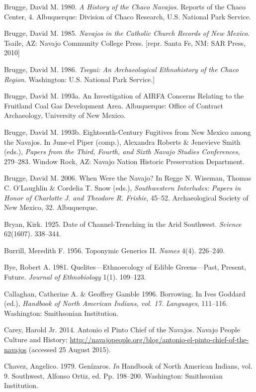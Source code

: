 Brugge, David M. 1980.  \textit{A History of the Chaco Navajos}.  Reports of the Chaco Center, 4.  Albuquerque:  Division of Chaco Research, U.S. National Park Service.

Brugge, David M. 1985. \textit{Navajos in the Catholic Church Records of New Mexico}.  Tsaile, AZ:  Navajo Community College Press.  [repr. Santa Fe, NM:  SAR Press, 2010]

Brugge, David M. 1986. \textit{Tsegai: An Archaeological Ethnohistory of the Chaco Region}.  Washington:  U.S. National Park Service.]

Brugge, David M. 1993a. An Investigation of AIRFA Concerns Relating to the Fruitland Coal Gas Development Area.  Albuquerque:  Office of Contract Archaeology, University of New Mexico.

Brugge, David M. 1993b.  Eighteenth-Century Fugitives from New Mexico among the Navajos.  In June-el Piper (comp.), Alexandra Roberts \& Jenevieve Smith (eds.), \textit{Papers from the Third, Fourth, and Sixth Navajo Studies Conferences}, 279--283.  Window Rock, AZ:  Navajo Nation Historic Preservation Department.

Brugge, David M. 2006.  When Were the Navajo? In Regge N. Wiseman, Thomas C. O’Laughlin \& Cordelia T. Snow (eds.), \textit{Southwestern Interludes: Papers in Honor of Charlotte J. and Theodore R. Frisbie}, 45--52.  Archaeological Society of New Mexico, 32.  Albuquerque.

Bryan, Kirk.  1925.  Date of Channel-Trenching in the Arid Southwest.  \textit{Science} 62(1607). 338--344.

Burrill, Meredith F.  1956.  Toponymic Generics II.  \textit{Names} 4(4). 226--240.

Bye, Robert A. 1981.  Quelites—Ethnoecology of Edible Greens—Past, Present, Future.  \textit{Journal of Ethnobiology} 1(1). 109--123.

Callaghan, Catherine A. \& Geoffrey Gamble  1996.  Borrowing. In Ives Goddard (ed.), \textit{Handbook of North American Indians, vol. 17.  Languages}, 111--116.  Washington:  Smithsonian Institution.

Carey, Harold Jr.  2014.  Antonio el Pinto Chief of the Navajos.  Navajo People Culture and History; \url{http://navajopeople.org/blog/antonio-el-pinto-chief-of-the-navajos} (accessed 25 August 2015).

Chavez, Angelico. 1979.  Genízaros.  \textit{In }Handbook of North American Indians, vol. 9.  Southwest, Alfonso Ortiz, ed.  Pp. 198--200.  Washington:  Smithsonian Institution.

